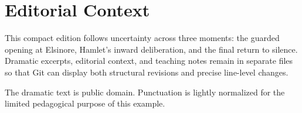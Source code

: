 \section*{Editorial Context}
This compact edition follows uncertainty across three moments: the guarded
opening at Elsinore, Hamlet's inward deliberation, and the final return to
silence. Dramatic excerpts, editorial context, and teaching notes remain in
separate files so that Git can display both structural revisions and precise
line-level changes.

The dramatic text is public domain. Punctuation is lightly normalized for the
limited pedagogical purpose of this example.
